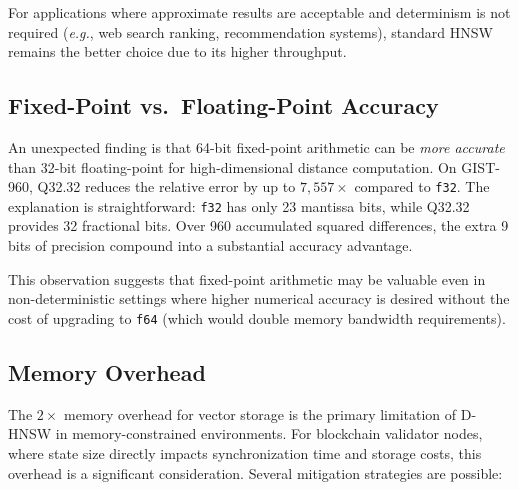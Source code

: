 \documentclass[10pt,journal]{IEEEtran}
\newcommand{\dhnsw}{\textsc{D-HNSW}}
\newcommand{\hnsw}{\textsc{HNSW}}
\newcommand{\eg}{\textit{e.g.}}
\begin{document}
For applications where approximate results are acceptable and determinism is not required (\eg, web search ranking, recommendation systems), standard \hnsw{} remains the better choice due to its higher throughput.

\subsection{Fixed-Point vs.\ Floating-Point Accuracy}

An unexpected finding is that 64-bit fixed-point arithmetic can be \emph{more accurate} than 32-bit floating-point for high-dimensional distance computation. On GIST-960, Q32.32 reduces the relative error by up to $7{,}557\times$ compared to \texttt{f32}. The explanation is straightforward: \texttt{f32} has only 23 mantissa bits, while Q32.32 provides 32 fractional bits. Over 960 accumulated squared differences, the extra 9 bits of precision compound into a substantial accuracy advantage.

This observation suggests that fixed-point arithmetic may be valuable even in non-deterministic settings where higher numerical accuracy is desired without the cost of upgrading to \texttt{f64} (which would double memory bandwidth requirements).

\subsection{Memory Overhead}

The $2\times$ memory overhead for vector storage is the primary limitation of \dhnsw{} in memory-constrained environments. For blockchain validator nodes, where state size directly impacts synchronization time and storage costs, this overhead is a significant consideration. Several mitigation strategies are possible:
\end{document}
